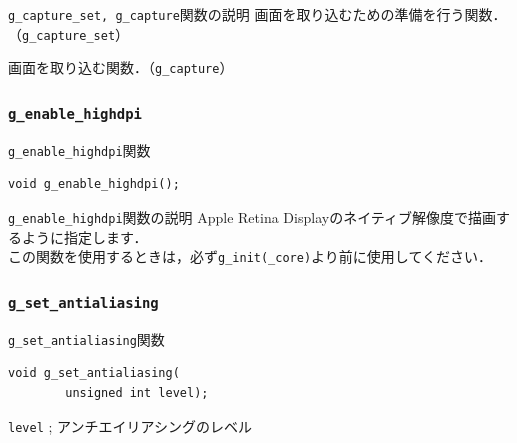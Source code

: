 \documentclass[platex,a4paper,12pt]{jsarticle}%
\begin{document}
\begin{itembox}[l]{\texttt{g\_capture\_set, g\_capture}関数の説明}
画面を取り込むための準備を行う関数．（\verb|g_capture_set|）

画面を取り込む関数．（\verb|g_capture|）
\end{itembox}

\clearpage
\subsubsection{\texttt{g\_enable\_highdpi}}

\begin{itembox}[l]{\texttt{g\_enable\_highdpi}関数}
\begin{verbatim}
void g_enable_highdpi();
\end{verbatim}
\end{itembox}

\begin{itembox}[l]{\texttt{g\_enable\_highdpi}関数の説明}
Apple Retina Displayのネイティブ解像度で描画するように指定します．\\
この関数を使用するときは，必ず\verb|g_init(_core)|より前に使用してください．
\end{itembox}

\subsubsection{\texttt{g\_set\_antialiasing}}

\begin{itembox}[l]{\texttt{g\_set\_antialiasing}関数}
\begin{verbatim}
void g_set_antialiasing(
        unsigned int level);
\end{verbatim}

\verb|level| ; アンチエイリアシングのレベル
\end{itembox}
\end{document}
